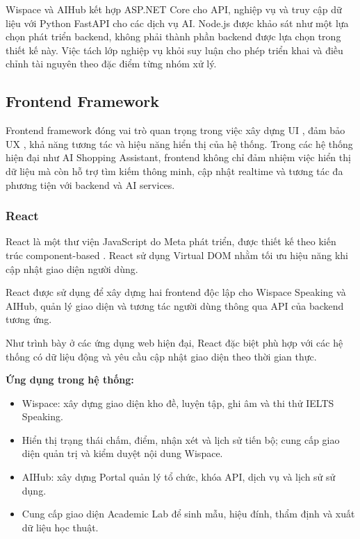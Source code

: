 Wispace và AIHub kết hợp ASP.NET Core cho API, nghiệp vụ và truy cập dữ liệu với Python FastAPI cho các dịch vụ AI. Node.js được khảo sát như một lựa chọn phát triển backend, không phải thành phần backend được lựa chọn trong thiết kế này. Việc tách lớp nghiệp vụ khỏi suy luận cho phép triển khai và điều chỉnh tài nguyên theo đặc điểm từng nhóm xử lý.

\subsection{Frontend Framework}

Frontend framework đóng vai trò quan trọng trong việc xây dựng UI , đảm bảo UX , khả năng tương tác và hiệu năng hiển thị của hệ thống. Trong các hệ thống hiện đại như AI Shopping Assistant, frontend không chỉ đảm nhiệm việc hiển thị dữ liệu mà còn hỗ trợ tìm kiếm thông minh, cập nhật realtime và tương tác đa phương tiện với backend và AI services.

\subsubsection{React}

React là một thư viện JavaScript do Meta phát triển, được thiết kế theo kiến trúc component-based \textcite{reactdocs2024}. React sử dụng Virtual DOM nhằm tối ưu hiệu năng khi cập nhật giao diện người dùng.

React được sử dụng để xây dựng hai frontend độc lập cho Wispace Speaking và AIHub, quản lý giao diện và tương tác người dùng thông qua API của backend tương ứng.

Như trình bày ở các ứng dụng web hiện đại, React đặc biệt phù hợp với các hệ thống có dữ liệu động và yêu cầu cập nhật giao diện theo thời gian thực.

\textbf{Ứng dụng trong hệ thống:}
\begin{itemize}
    \item Wispace: xây dựng giao diện kho đề, luyện tập, ghi âm và thi thử IELTS Speaking.
    \item Hiển thị trạng thái chấm, điểm, nhận xét và lịch sử tiến bộ; cung cấp giao diện quản trị và kiểm duyệt nội dung Wispace.
    \item AIHub: xây dựng Portal quản lý tổ chức, khóa API, dịch vụ và lịch sử sử dụng.
    \item Cung cấp giao diện Academic Lab để sinh mẫu, hiệu đính, thẩm định và xuất dữ liệu học thuật.
\end{itemize}

